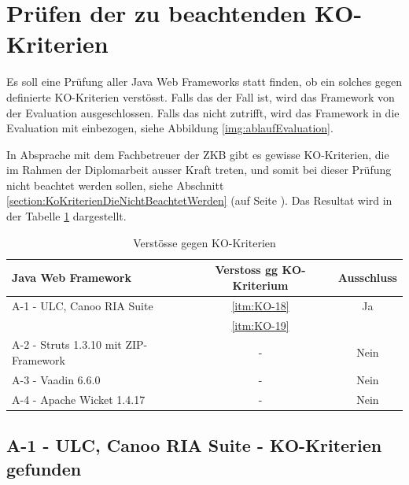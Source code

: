   \section{Prüfen der zu beachtenden KO-Kriterien}
  
  Es soll eine Prüfung aller Java Web Frameworks statt finden, ob ein solches
  gegen definierte KO-Kriterien verstösst. Falls das der Fall ist, wird das
  Framework von der Evaluation ausgeschlossen. Falls das nicht zutrifft, wird
  das Framework in die Evaluation mit einbezogen, siehe Abbildung
  \ref{img:ablaufEvaluation}.
  
  In Absprache mit dem Fachbetreuer der \ac{ZKB} gibt es gewisse KO-Kriterien,
  die im Rahmen der Diplomarbeit ausser Kraft treten, und somit bei dieser
  Prüfung nicht beachtet werden sollen, siehe Abschnitt
  \ref{section:KoKriterienDieNichtBeachtetWerden}
   (auf Seite
  \pageref{section:KoKriterienDieNichtBeachtetWerden}). Das Resultat wird in
  der Tabelle \ref{tab:gefundeneKOKriterien} dargestellt.
  \newline
  
  \begin{table}[!h]
    \sffamily 
    \begin{center}
      \begin{tabular}{lcc}
        \toprule
        \textbf{Java Web Framework} & \textbf{Verstoss gg KO-Kriterium} &
        \textbf{Ausschluss}\\
        \midrule
        A-1 - ULC, Canoo RIA Suite & \ref{itm:KO-18} & Ja\\
        & \ref{itm:KO-19} &\\
        A-2 - Struts 1.3.10 mit ZIP-Framework & - & Nein\\
        A-3 - Vaadin 6.6.0 & - & Nein\\
        A-4 - Apache Wicket 1.4.17 & - & Nein\\
        \bottomrule
      \end{tabular}
      \caption{Verstösse gegen KO-Kriterien}
      \label{tab:gefundeneKOKriterien}
    \end{center}
  \end{table}

  \subsection{A-1 - ULC, Canoo RIA Suite - KO-Kriterien gefunden}
  
